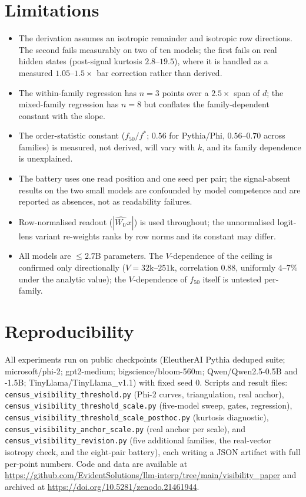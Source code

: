 \documentclass[11pt]{article}
\newcommand{\WU}{W_U}
\newcommand{\fstar}{f^{*}}
\begin{document}
\section{Limitations}

\begin{itemize}
\item The derivation assumes an isotropic remainder and isotropic
  row directions. The second fails measurably on two of ten models;
  the first fails on real hidden states (post-signal kurtosis
  $2.8$--$19.5$), where it is handled as a measured $1.05$--$1.5
  \times$ bar correction rather than derived.
\item The within-family regression has $n{=}3$ points over a
  $2.5\times$ span of $d$; the mixed-family regression has $n{=}8$
  but conflates the family-dependent constant with the slope.
\item The order-statistic constant ($f_{50}/\fstar$; $0.56$ for
  Pythia/Phi, $0.56$--$0.70$ across families) is measured, not
  derived, will vary with $k$, and its family dependence is
  unexplained.
\item The battery uses one read position and one seed per pair; the
  signal-absent results on the two small models are confounded by
  model competence and are reported as absences, not as readability
  failures.
\item Row-normalised readout ($|\hat{\WU}x|$) is used throughout;
  the unnormalised logit-lens variant re-weights ranks by row norms
  and its constant may differ.
\item All models are $\leq 2.7$B parameters. The $V$-dependence of
  the ceiling is confirmed only directionally ($V = 32$k--$251$k,
  correlation $0.88$, uniformly $4$--$7\%$ under the analytic
  value); the $V$-dependence of $f_{50}$ itself is untested
  per-family.
\end{itemize}

\section{Reproducibility}
\label{sec:repro}

{\raggedright
All experiments run on public checkpoints (EleutherAI Pythia deduped
suite; microsoft/phi-2; gpt2-medium; bigscience/bloom-560m;
Qwen/Qwen2.5-0.5B and -1.5B; TinyLlama/TinyLlama\_v1.1) with fixed
seed 0. Scripts and result files:
\texttt{census\_visibility\_threshold.py} (Phi-2 curves,
triangulation, real anchor),
\texttt{census\_visibility\_threshold\_scale.py} (five-model sweep,
gates, regression),
\texttt{census\_visibility\_threshold\_scale\_posthoc.py} (kurtosis
diagnostic),
\texttt{census\_visibility\_anchor\_scale.py} (real anchor per
scale), and
\texttt{census\_visibility\_revision.py} (five additional families,
the real-vector isotropy check, and the eight-pair battery), each
writing a JSON artifact with full per-point numbers. Code and data are
available at
\url{https://github.com/EvidentSolutions/llm-interp/tree/main/visibility_paper}
and archived at \url{https://doi.org/10.5281/zenodo.21461944}.\par}
\end{document}
